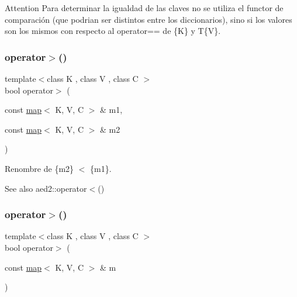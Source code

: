 \begin{DoxyAttention}{Attention}
Para determinar la igualdad de las claves no se utiliza el functor de comparación (que podrian ser distintos entre los diccionarios), sino si los valores son los mismos con respecto al operator== de \{K\} y T\{V\}. 
\end{DoxyAttention}
\mbox{\label{classaed2_1_1map_a2000cd874b72034ce7fe730c811b6c63}} 
\subsubsection{\texorpdfstring{operator$>$()}{operator>()}\hspace{0.1cm}{\footnotesize\ttfamily [1/2]}}
{\footnotesize\ttfamily template$<$class K , class V , class C $>$ \\
bool operator$>$ (\begin{DoxyParamCaption}\item[{const \hyperlink{classaed2_1_1map}{map}$<$ K, V, C $>$ \&}]{m1,  }\item[{const \hyperlink{classaed2_1_1map}{map}$<$ K, V, C $>$ \&}]{m2 }\end{DoxyParamCaption})\hspace{0.3cm}{\ttfamily [related]}}



Renombre de \{m2\} $<$ \{m1\}. 

\begin{DoxySeeAlso}{See also}
aed2\+::operator$<$() 
\end{DoxySeeAlso}
\mbox{\label{classaed2_1_1map_a964e8d831c17d77f457eb87a2f22d0d0}} 
\subsubsection{\texorpdfstring{operator$>$()}{operator>()}\hspace{0.1cm}{\footnotesize\ttfamily [2/2]}}
{\footnotesize\ttfamily template$<$class K , class V , class C $>$ \\
bool operator$>$ (\begin{DoxyParamCaption}\item[{const \hyperlink{classaed2_1_1map}{map}$<$ K, V, C $>$ \&}]{m }\end{DoxyParamCaption})\hspace{0.3cm}{\ttfamily [related]}}



